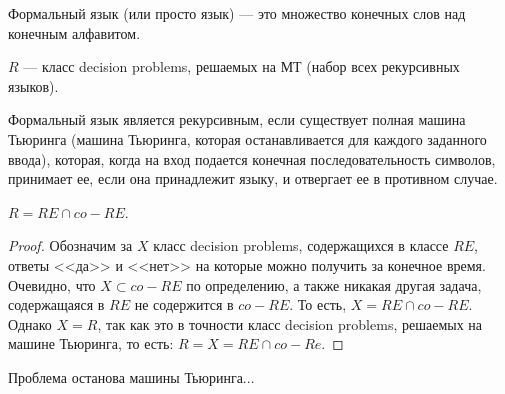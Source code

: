     \begin{Def}
        Формальный язык (или просто язык) --- это множество конечных слов над конечным алфавитом.
    \end{Def}
    \begin{Def}[Класс $R$]
        $R$ --- класс decision problems, решаемых на МТ (набор всех рекурсивных языков). 
    \end{Def}
    \begin{Def} Формальный язык является рекурсивным, если            существует полная машина Тьюринга (машина Тьюринга, которая останавливается для    каждого заданного ввода), которая, когда на вход подается конечная                  последовательность символов, принимает ее, если она принадлежит языку, и отвергает    ее в противном случае. 
    \end{Def}
    \begin{Thm}
        $R = RE \cap co-RE$.
    \end{Thm}
    \begin{proof}
        Обозначим за $X$ класс decision problems, содержащихся в классе $RE$, ответы <<да>> и <<нет>> на которые можно получить за конечное время. Очевидно, что $X \subset co-RE$ по определению, а также никакая другая задача, содержащаяся в $RE$ не содержится в $co-RE$. То есть, $X = RE \cap co-RE$. Однако $X = R$, так как это в точности класс decision problems, решаемых на машине Тьюринга, то есть: $R = X = RE \cap co-Re$.
    \end{proof}
    \begin{Def}
        Проблема останова машины Тьюринга...
    \end{Def}

